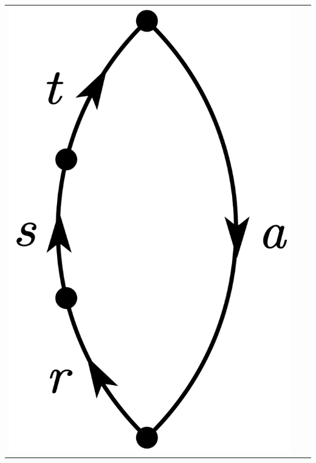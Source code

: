\documentclass[a4paper]{book}
\newcounter{solution}[chapter]
\begin{document}
\begin{solution}
\begin{itemize}
\begin{center}
\begin{tabular}{ccc}
		\begin{minipage}{0.22\linewidth}
		\centering
		\includegraphics[scale=1.0,trim=0 -4 0 -4]{./pictures/6.07/diagram_3.png}
		\end{minipage} \\
		

\end{tabular}
\end{center}
\end{itemize}
\end{solution}
\end{document}
